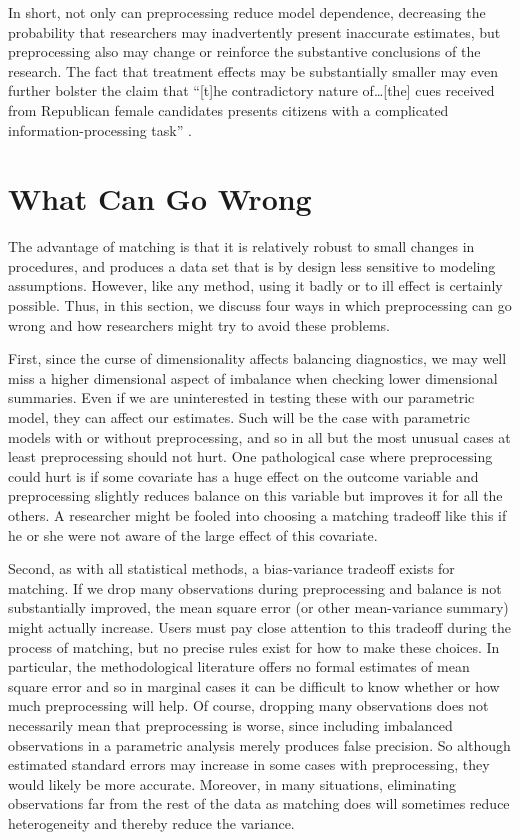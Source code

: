 \documentclass[11pt,titlepage]{article}
\begin{document}
In short, not only can preprocessing reduce model dependence,
decreasing the probability that researchers may inadvertently present
inaccurate estimates, but preprocessing also may change or reinforce
the substantive conclusions of the research.  The fact that treatment
effects may be substantially smaller may even further bolster the
claim that ``[t]he contradictory nature of\ldots [the] cues received
from Republican female candidates presents citizens with a complicated
information-processing task'' \citep[p.  460]{Koch02}.

\section{What Can Go Wrong}

The advantage of matching is that it is relatively robust to small
changes in procedures, and produces a data set that is by design less
sensitive to modeling assumptions.  However, like any method, using it
badly or to ill effect is certainly possible.  Thus, in this section,
we discuss four ways in which preprocessing can go wrong and how
researchers might try to avoid these problems.

First, since the curse of dimensionality affects balancing
diagnostics, we may well miss a higher dimensional aspect of imbalance
when checking lower dimensional summaries.  Even if we are
uninterested in testing these with our parametric model, they can
affect our estimates.  Such will be the case with parametric models
with or without preprocessing, and so in all but the most unusual
cases at least preprocessing should not hurt.  One pathological case
where preprocessing could hurt is if some covariate has a huge effect
on the outcome variable and preprocessing slightly reduces balance on
this variable but improves it for all the others.  A researcher might
be fooled into choosing a matching tradeoff like this if he or she
were not aware of the large effect of this covariate.

Second, as with all statistical methods, a bias-variance tradeoff
exists for matching.  If we drop many observations during
preprocessing and balance is not substantially improved, the mean
square error (or other mean-variance summary) might actually increase.
Users must pay close attention to this tradeoff during the process of
matching, but no precise rules exist for how to make these choices.
In particular, the methodological literature offers no formal
estimates of mean square error and so in marginal cases it can be
difficult to know whether or how much preprocessing will help.  Of
course, dropping many observations does not necessarily mean that
preprocessing is worse, since including imbalanced observations in a
parametric analysis merely produces false precision.  So although
estimated standard errors may increase in some cases with
preprocessing, they would likely be more accurate.  Moreover, in many
situations, eliminating observations far from the rest of the data as
matching does will sometimes reduce heterogeneity and thereby reduce
the variance.
\end{document}
